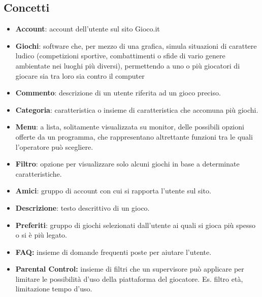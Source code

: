 \documentclass[../Report.tex]{subfiles}
\begin{document}
    \subsection{Concetti}
 \begin{itemize}
    \item    \textbf{Account}: account dell'utente sul sito Gioco.it
    \item    \textbf{Giochi}: software che, per mezzo di una grafica, simula situazioni di carattere ludico (competizioni sportive, combattimenti o sfide di vario genere ambientate nei luoghi più diversi), permettendo a uno o più giocatori di giocare sia tra loro sia contro il computer
    \item    \textbf{Commento}: descrizione di un utente riferita ad un gioco preciso. 
    \item    \textbf{Categoria}: caratteristica o insieme di caratteristica che accomuna più giochi.
    \item    \textbf{Menu}: a lista, solitamente visualizzata su monitor, delle possibili opzioni offerte da un programma, che rappresentano altrettante funzioni tra le quali l’operatore può scegliere.
    \item    \textbf{Filtro}: opzione per visualizzare solo alcuni giochi in base a determinate caratteristiche.
    \item    \textbf{Amici}: gruppo di account con cui si rapporta l'utente sul sito.
    \item    \textbf{Descrizione}: testo descrittivo di un gioco.
    \item    \textbf{Preferiti}: gruppo di giochi selezionati dall'utente ai quali si gioca più spesso o si è più legato.
    \item \textbf{FAQ:} insieme di domande frequenti poste per aiutare l'utente.
    \item \textbf{Parental Control:} insieme di filtri che un supervisore può applicare per limitare le possibilità d'uso della piattaforma del giocatore. Es. filtro età, limitazione tempo d'uso. 
 \end{itemize}
\end{document}
